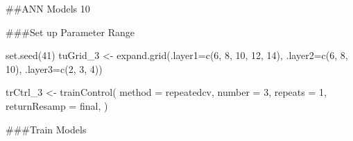 \documentclass[
]{article}
\newenvironment{Shaded}{\begin{snugshade}}{\end{snugshade}}
\newcommand{\AttributeTok}[1]{\textcolor[rgb]{0.77,0.63,0.00}{#1}}
\newcommand{\DecValTok}[1]{\textcolor[rgb]{0.00,0.00,0.81}{#1}}
\newcommand{\FunctionTok}[1]{\textcolor[rgb]{0.00,0.00,0.00}{#1}}
\newcommand{\NormalTok}[1]{#1}
\newcommand{\OtherTok}[1]{\textcolor[rgb]{0.56,0.35,0.01}{#1}}
\newcommand{\StringTok}[1]{\textcolor[rgb]{0.31,0.60,0.02}{#1}}
\begin{document}
\#\#ANN Models 10

\#\#\#Set up Parameter Range

\begin{Shaded}
\begin{Highlighting}[]
\FunctionTok{set.seed}\NormalTok{(}\DecValTok{41}\NormalTok{)}
\NormalTok{tuGrid\_3 }\OtherTok{\textless{}{-}} \FunctionTok{expand.grid}\NormalTok{(}\AttributeTok{.layer1=}\FunctionTok{c}\NormalTok{(}\DecValTok{6}\NormalTok{, }\DecValTok{8}\NormalTok{, }\DecValTok{10}\NormalTok{, }\DecValTok{12}\NormalTok{, }\DecValTok{14}\NormalTok{), }\AttributeTok{.layer2=}\FunctionTok{c}\NormalTok{(}\DecValTok{6}\NormalTok{, }\DecValTok{8}\NormalTok{, }\DecValTok{10}\NormalTok{), }\AttributeTok{.layer3=}\FunctionTok{c}\NormalTok{(}\DecValTok{2}\NormalTok{, }\DecValTok{3}\NormalTok{, }\DecValTok{4}\NormalTok{))}

\NormalTok{trCtrl\_3 }\OtherTok{\textless{}{-}} \FunctionTok{trainControl}\NormalTok{(}
  \AttributeTok{method =} \StringTok{\textquotesingle{}repeatedcv\textquotesingle{}}\NormalTok{,}
  \AttributeTok{number =} \DecValTok{3}\NormalTok{,}
  \AttributeTok{repeats =} \DecValTok{1}\NormalTok{,}
  \AttributeTok{returnResamp =} \StringTok{\textquotesingle{}final\textquotesingle{}}\NormalTok{,}
\NormalTok{)}
\end{Highlighting}
\end{Shaded}

\#\#\#Train Models
\end{document}
